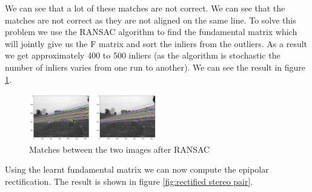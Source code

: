 \documentclass[10pt,twocolumn,letterpaper]{article}
\begin{document}
We can see that a lot of these matches are not correct. We can see that the matches are not correct as they are not aligned on the same line.  To solve this problem we use the RANSAC algorithm to find the fundamental matrix which will jointly give us the F matrix and sort the inliers from the outliers.
As a result we get approximately 400 to 500 inliers (as the algorithm is stochastic the number of inliers varies from one run to another). We can see the result in figure \ref{fig:ransac}.
\begin{figure}
    \centering
    \includegraphics[width=0.5\textwidth]{easy_ransac.png}
    \caption{Matches between the two images after RANSAC}
    \label{fig:ransac}
\end{figure}

Using the learnt fundamental matrix we can now compute the epipolar rectification. The result is shown in figure \ref{fig:rectified stereo pair}.
\end{document}
